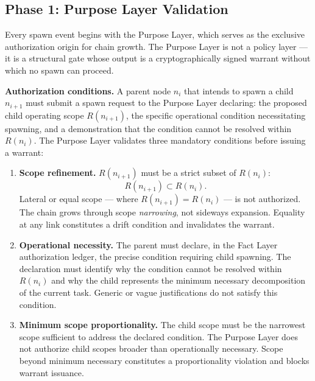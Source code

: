 \subsection{Phase 1: Purpose Layer Validation}
\label{sec:rs-purpose-validation}

Every spawn event begins with the Purpose Layer, which serves as the exclusive authorization origin for chain growth. The Purpose Layer is not a policy layer — it is a structural gate whose output is a cryptographically signed warrant without which no spawn can proceed.

\medskip
\noindent\textbf{Authorization conditions.} A parent node $n_i$ that intends to spawn a child $n_{i+1}$ must submit a spawn request to the Purpose Layer declaring: the proposed child operating scope $R(n_{i+1})$, the specific operational condition necessitating spawning, and a demonstration that the condition cannot be resolved within $R(n_i)$. The Purpose Layer validates three mandatory conditions before issuing a warrant:

\begin{enumerate}
    \item[(P1)] \textbf{Scope refinement.} $R(n_{i+1})$ must be a strict subset of $R(n_i)$:
    \begin{equation}
    R(n_{i+1}) \subset R(n_i).
    \label{eq:scope-refinement}
    \end{equation}
    Lateral or equal scope — where $R(n_{i+1}) = R(n_i)$ — is not authorized. The chain grows through scope \emph{narrowing}, not sideways expansion. Equality at any link constitutes a drift condition and invalidates the warrant.

    \item[(P2)] \textbf{Operational necessity.} The parent must declare, in the Fact Layer authorization ledger, the precise condition requiring child spawning. The declaration must identify why the condition cannot be resolved within $R(n_i)$ and why the child represents the minimum necessary decomposition of the current task. Generic or vague justifications do not satisfy this condition.

    \item[(P3)] \textbf{Minimum scope proportionality.} The child scope must be the narrowest scope sufficient to address the declared condition. The Purpose Layer does not authorize child scopes broader than operationally necessary. Scope beyond minimum necessary constitutes a proportionality violation and blocks warrant issuance.
\end{enumerate}

